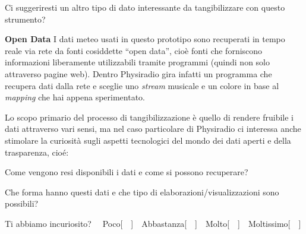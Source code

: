 \begin{compactenum}

	\item Ci suggeriresti un altro tipo di dato interessante da tangibilizzare con questo strumento?\newline
	[\dotfill]\newline
	[\dotfill]


\item \textbf{Open Data}\newline
I dati meteo usati in questo prototipo sono recuperati in tempo reale via rete da fonti cosiddette ``open data'', cioè fonti che forniscono informazioni liberamente utilizzabili tramite programmi (quindi non solo attraverso pagine web). Dentro Physiradio gira infatti un programma che recupera dati dalla rete e sceglie uno \textit{stream} musicale e un colore in base al \textit{mapping} che hai appena sperimentato.

Lo scopo primario del processo di tangibilizzazione è quello di rendere fruibile i dati attraverso vari sensi, ma nel caso particolare di Physiradio ci interessa anche stimolare la curiosità sugli aspetti tecnologici
del mondo dei dati aperti e della trasparenza, cioé:
\begin{compactitem}
	\item Come vengono resi disponibili i dati e come si possono recuperare?
	\item Che forma hanno questi dati e che tipo di elaborazioni/visualizzazioni sono possibili?
\end{compactitem}
Ti abbiamo incuriosito?
~~Poco[~~]~~Abbastanza[~~]~~Molto[~~]~~Moltissimo[~~]


\end{compactenum}

